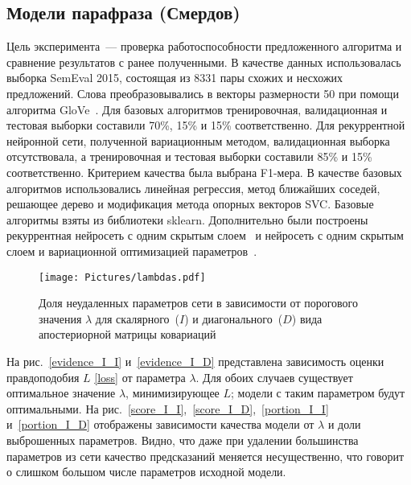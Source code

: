 \subsection{Модели парафраза (Смердов)}
Цель эксперимента~--- проверка работоспособности предложенного алгоритма и сравнение результатов с ранее полученными. В качестве данных использовалась выборка SemEval 2015, состоящая из 8331 пары схожих и несхожих предложений. Слова преобразовывались в векторы размерности 50 при помощи алгоритма GloVe~\cite{GloveURL}.
Для базовых алгоритмов тренировочная, валидационная и тестовая выборки составили 70\%, 15\% и 15\% соответственно.
Для рекуррентной нейронной сети, полученной вариационным методом, валидационная выборка отсутствовала, а тренировочная и тестовая выборки составили 85\% и 15\% соответственно.
Критерием качества была выбрана F1-мера.
В качестве базовых алгоритмов использовались линейная регрессия, метод ближайших соседей, решающее дерево и модификация метода опорных векторов SVC. Базовые алгоритмы взяты из библиотеки sklearn. 
Дополнительно были построены рекуррентная нейросеть с одним скрытым слоем~\cite{Sanborn} и нейросеть с одним скрытым слоем и вариационной оптимизацией параметров~\cite{Graves, code}.

\begin{figure}[!h]
	\centering
	\texttt{[image: Pictures/lambdas.pdf]}
	\caption{Доля неудаленных параметров сети в зависимости от порогового значения $\lambda$ для скалярного~($I$) и диагонального~($D$) вида апостериорной матрицы ковариаций}
	\label{lambdas}
\end{figure}

 

На рис.~\ref{evidence_I_I} и~\ref{evidence_I_D} представлена зависимость оценки правдоподобия $L$ \eqref{loss} от параметра $\lambda$.
Для обоих случаев существует оптимальное значение $\lambda$, минимизирующее $L$; модели с таким параметром будут оптимальными. На рис.~\ref{score_I_I},~\ref{score_I_D},~\ref{portion_I_I} и~\ref{portion_I_D} отображены зависимости качества модели от $\lambda$ и доли выброшенных параметров. Видно, что даже при удалении большинства параметров из сети качество предсказаний меняется несущественно, что говорит о слишком большом числе параметров исходной модели.


